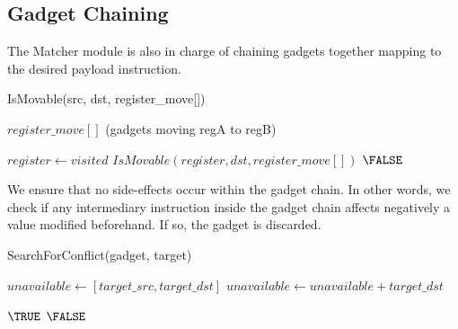\documentclass[10pt,twocolumn]{article}
\begin{document}
\subsection{Gadget Chaining}

The Matcher module is also in charge of chaining gadgets together mapping to
the desired payload instruction. 

\begin{algorithm}
    \caption{IsMovable(src, dst, register\_move[])}
    \begin{algorithmic}[1] 
        \REQUIRE $register\_move[]$ (gadgets moving regA to regB)
        
                        \RETURN \TRUE
                        \ENDIF
                    \ENDIF
                \ENDFOR
            \ENDIF
        \ENDFOR

                \STATE $register \leftarrow visited$
                        \RETURN $IsMovable(register, dst, register\_move[])$
                        \ENDIF
                    \ENDIF
                \ENDFOR
            \ENDIF
        \ENDFOR
        \RETURN $\FALSE$

    \end{algorithmic}
\end{algorithm}

We ensure that no side-effects occur within the gadget chain. In other words,
we check if any intermediary instruction inside the gadget chain affects
negatively a value modified beforehand. If so, the gadget is discarded.

\begin{algorithm}
    \caption{SearchForConflict(gadget, target)}
    \begin{algorithmic}[1]
        \STATE $unavailable \leftarrow [target\_src, target\_dst]$
            \STATE $unavailable \leftarrow unavailable + target\_dst$
        \ENDIF
        
            \RETURN $\TRUE$
            \ENDIF
        \ENDFOR
        \RETURN $\FALSE$
    \end{algorithmic}
\end{algorithm}
\end{document}
